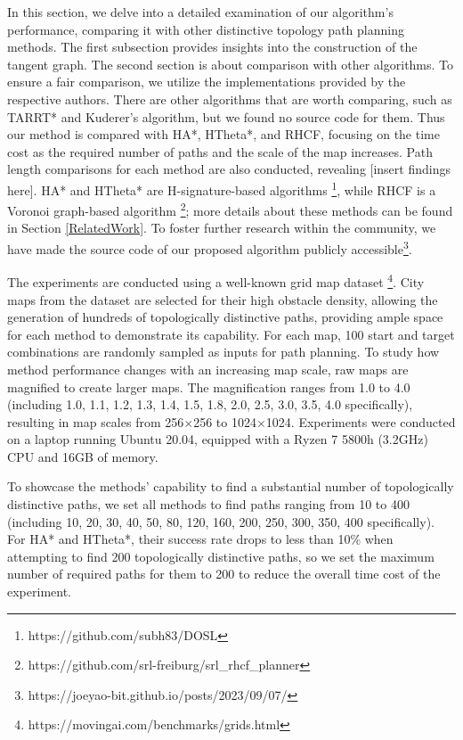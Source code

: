 \documentclass[letterpaper, 10 pt, journal, twoside]{IEEEtran}
\begin{document}
In this section, we delve into a detailed examination of our algorithm's performance, comparing it with other distinctive topology path planning methods. The first subsection provides insights into the construction of the tangent graph. The second section is about comparison with other algorithms. To ensure a fair comparison, we utilize the implementations provided by the respective authors. There are other algorithms that are worth comparing, such as TARRT*\cite{19} and Kuderer's algorithm\cite{kuderer2014online}, but we found no source code for them. Thus our method is compared with HA*, HTheta*, and RHCF, focusing on the time cost as the required number of paths and the scale of the map increases. Path length comparisons for each method are also conducted, revealing [insert findings here]. HA* and HTheta* are H-signature-based algorithms \footnote{https://github.com/subh83/DOSL}, while RHCF is a Voronoi graph-based algorithm \footnote{https://github.com/srl-freiburg/srl\_rhcf\_planner}; more details about these methods can be found in Section \ref{RelatedWork}. To foster further research within the community, we have made the source code of our proposed algorithm publicly accessible\footnote{https://joeyao-bit.github.io/posts/2023/09/07/}.

The experiments are conducted using a well-known grid map dataset \cite{sturtevant2012benchmarks} \footnote{https://movingai.com/benchmarks/grids.html}. City maps from the dataset are selected for their high obstacle density, allowing the generation of hundreds of topologically distinctive paths, providing ample space for each method to demonstrate its capability. For each map, 100 start and target combinations are randomly sampled as inputs for path planning. To study how method performance changes with an increasing map scale, raw maps are magnified to create larger maps. The magnification ranges from 1.0 to 4.0 (including 1.0, 1.1, 1.2, 1.3, 1.4, 1.5, 1.8, 2.0, 2.5, 3.0, 3.5, 4.0 specifically), resulting in map scales from 256$\times$256 to 1024$\times$1024. Experiments were conducted on a laptop running Ubuntu 20.04, equipped with a Ryzen 7 5800h (3.2GHz) CPU and 16GB of memory.

To showcase the methods' capability to find a substantial number of topologically distinctive paths, we set all methods to find paths ranging from 10 to 400 (including 10, 20, 30, 40, 50, 80, 120, 160, 200, 250, 300, 350, 400 specifically). For HA* and HTheta*, their success rate drops to less than 10\% when attempting to find 200 topologically distinctive paths, so we set the maximum number of required paths for them to 200 to reduce the overall time cost of the experiment.
\end{document}
